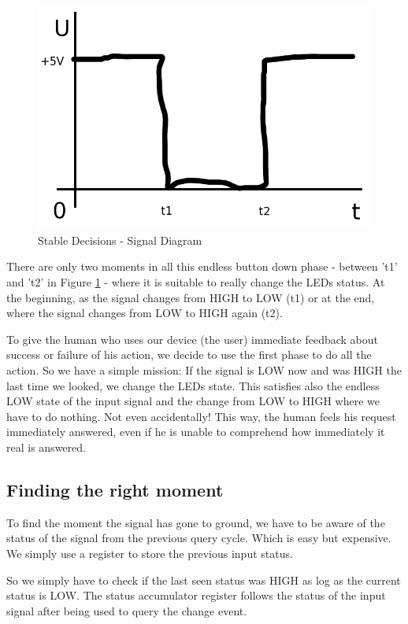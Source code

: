 \begin{figure}[htbp]
  \centering
  \includegraphics[width=120mm]{LED/S005_stable-decisions_ideal_signal.png}
  \caption{Stable Decisions - Signal Diagram}
  \label{S005SignalDiagam}
\end{figure}



There are only two moments in all this endless button down phase - between 't1' and 't2' in Figure \ref{S005SignalDiagam} - where it is suitable to really change the LEDs status. At the beginning, as the signal changes from HIGH to LOW (t1) or at the end, where the signal changes from LOW to HIGH again (t2).

To give the human who uses our device (the user) immediate feedback about success or failure of his action, we decide to use the first phase to do all the action. So we have a simple mission: If the signal is LOW now and was HIGH the last time we looked, we change the LEDs state. This satisfies also the endless LOW state of the input signal and the change from LOW to HIGH where we have to do nothing. Not even accidentally! This way, the human feels his request immediately answered, even if he is unable to comprehend how immediately it real is answered.


\subsection{Finding the right moment}

To find the moment the signal has gone to ground, we have to be aware of the status of the signal from the previous query cycle. Which is easy but expensive. We simply use a register to store the previous input status.

So we simply have to check if the last seen status was HIGH as log as the current status is LOW. The status accumulator register follows the status of the input signal after being used to query the change event.

